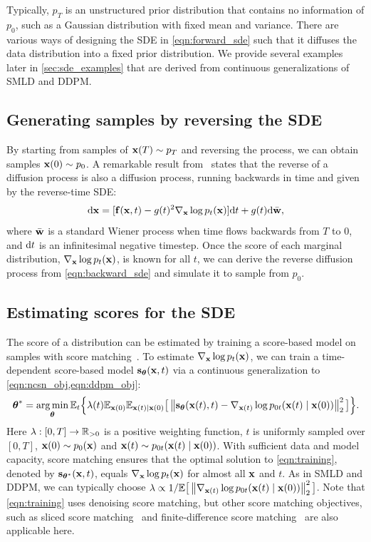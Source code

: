 Typically, $p_T$ is an unstructured prior distribution that contains no information of $p_0$, such as a Gaussian distribution with fixed mean and variance. There are various ways of designing the SDE in \cref{eqn:forward_sde} such that it diffuses the data distribution into a fixed prior distribution. We provide several examples later in \cref{sec:sde_examples} that are derived from continuous generalizations of SMLD and DDPM.

\subsection{Generating samples by reversing the SDE}\label{sec:sde_reverse}
By starting from samples of $\mathbf{x}(T) \sim p_T$ and reversing the process, we can obtain samples $\mathbf{x}(0)\sim p_0$. %
A remarkable result from~\citet{Anderson1982-ny} states that the reverse of a diffusion process is also a diffusion process, running backwards in time and given by the reverse-time SDE:
\begin{align}
    \mathrm{d} \mathbf{x} = [\mathbf{f}(\mathbf{x}, t) - g(t)^2  \nabla_{\mathbf{x}}  \log p_t(\mathbf{x})] \mathrm{d} t + g(t) \mathrm{d} \bar{\mathbf{w}},\label{eqn:backward_sde}
\end{align}
where $\bar{\mathbf{w}}$ is a standard Wiener process
when time flows backwards from $T$ to $0$, and $\mathrm{d} t$ is an infinitesimal negative timestep. Once the score of each marginal distribution, $\nabla_{\mathbf{x}} \log p_t(\mathbf{x})$, is known for all $t$, we can derive the reverse diffusion process from \cref{eqn:backward_sde} and simulate it to sample from $p_0$.


\subsection{Estimating scores for the SDE}\label{sec:training}
The score of a distribution can be estimated by training a score-based model on samples with score matching~\citep{hyvarinen2005estimation,song2019sliced}. To estimate $\nabla_{\mathbf{x}} \log p_t(\mathbf{x})$, we can train a time-dependent score-based model $\mathbf{s}_{\boldsymbol{\theta}}(\mathbf{x}, t)$ via a continuous generalization to \cref{eqn:ncsn_obj,eqn:ddpm_obj}:
\begin{align}
   \bftheta^* = \argmin_\bftheta 
   \mbb{E}_{t}\Big\{\lambda(t) \mbb{E}_{\bfx(0)}\mbb{E}_{\bfx(t) \mid \bfx(0) }
   \big[\norm{\bfs_\bftheta(\bfx(t), t) - \nabla_{\bfx(t)}\log p_{0t}(\bfx(t) \mid \bfx(0))}_2^2 \big]\Big\}%
   . \label{eqn:training}
\end{align}
Here $\lambda: [0, T] \to \mathbb{R}_{>0}$ is a positive weighting function, $t$ is uniformly sampled over $[0, T]$, $\mathbf{x}(0) \sim p_0(\mathbf{x})$ and $\mathbf{x}(t) \sim p_{0t}(\mathbf{x}(t) \mid \mathbf{x}(0))$. With sufficient data and model capacity, score matching ensures that the optimal solution to \cref{eqn:training}, denoted by $\mathbf{s}_{{\boldsymbol{\theta}}^\ast}(\mathbf{x}, t)$, equals $\nabla_{\mathbf{x}} \log p_t(\mathbf{x})$ for almost all $\mathbf{x}$ and $t$. As in SMLD and DDPM, we can typically choose $\lambda \propto 1/{\mathbb{E}\big[\left\lVert\nabla_{\mathbf{x}(t)}\log p_{0t}(\mathbf{x}(t) \mid \mathbf{x}(0))\right\rVert_2^2\big]}$. Note that \cref{eqn:training} uses denoising score matching, but other score matching objectives, such as sliced score matching~\citep{song2019sliced} and finite-difference score matching~\citep{pang2020efficient} are also applicable here. 

